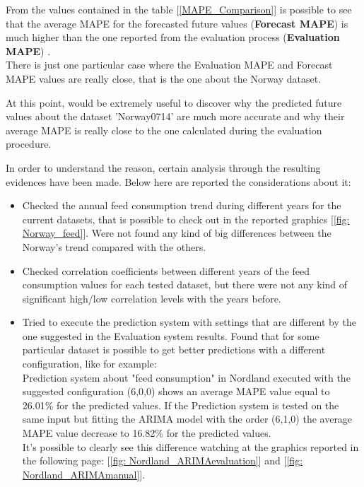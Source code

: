 From the values contained in the table [\ref{MAPE_Comparison}] is possible to see that the average MAPE for the forecasted future values (\textbf{Forecast MAPE}) is much higher than the one reported from the evaluation process (\textbf{Evaluation MAPE}) . \\
There is just one particular case where the Evaluation MAPE and Forecast MAPE values are really close, that is the one about the Norway dataset.

At this point, would be extremely useful to discover why the predicted future values about the dataset 'Norway0714' are much more accurate and why their average MAPE is really close to the one calculated during the evaluation procedure.

In order to understand the reason, certain analysis through the resulting evidences have been made. Below here are reported the considerations about it:
\vspace{-5mm}
\begin{itemize}
 \item Checked the annual feed consumption trend during different years for the current datasets, that is possible to check out in the reported graphics [\ref{fig: Norway_feed}]. Were not found any kind of big differences between the Norway's trend compared with the others.
 \item Checked correlation coefficients between different years of the feed consumption values for each tested dataset, but there were not any kind of significant high/low correlation levels with the years before.
 \item Tried to execute the prediction system with settings that are different by the one suggested in the Evaluation system results. Found that for some particular dataset is possible to get better predictions with a different configuration, like for example: \\
 Prediction system about "feed consumption" in Nordland executed with the suggested configuration (6,0,0) shows an average MAPE value equal to 26.01\% for the predicted values. If the Prediction system is tested on the same input but fitting the ARIMA model with the order (6,1,0) the average MAPE value decrease to 16.82\% for the predicted values. \\
 It's possible to clearly see this difference watching at the graphics reported in the following page: [\ref{fig: Nordland_ARIMAevaluation}] and [\ref{fig: Nordland_ARIMAmanual}].
\end{itemize}

